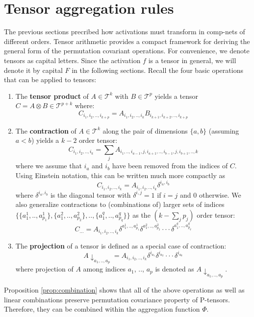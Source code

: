 \documentclass[sigchi]{acmart}
\theoremstyle{definition}
\theoremstyle{theorem}
\theoremstyle{corollary}
\theoremstyle{lemma}
\theoremstyle{remark}
\theoremstyle{prop}
\begin{document}
\section{Tensor aggregation rules}
\label{section:tensor-rules}

The previous sections precribed how activations must transform in comp-nets of different orders. Tensor arithmetic provides a compact framework for deriving the general form of the permutation covariant operations. For convenience, we denote tensors as capital letters. Since the activation $f$ is a tensor in general, we will denote it by capital $F$ in the following sections. Recall the four basic operations that can be applied to tensors:
\begin{enumerate}
\item The \textbf{tensor product} of $A \in \mathcal{T}^k$ with $B \in \mathcal{T}^p$ yields a tensor $C = A \otimes B \in \mathcal{T}^{p + k}$ where:
$$C_{i_1, i_2, .., i_{k + p}} = A_{i_1, i_2, .., i_k} B_{i_{k + 1}, i_{k + 2}, .., i_{k + p}}$$
\item The \textbf{contraction} of $A \in \mathcal{T}^k$ along the pair of dimensions $\{a, b\}$ (assuming $a < b$) yields a $k - 2$ order tensor:
$$C_{i_1, i_2, .., i_k} = \sum\limits_j A_{i_1, .., i_{a - 1}, j, i_{a + 1}, .., i_{b - 1}, j, i_{b + 1}, .., k}$$
where we assume that $i_a$ and $i_b$ have been removed from the indices of $C$. Using Einstein notation, this can be written much more compactly as
$$C_{i_1, i_2, .., i_k} = A_{i_1, i_2, .., i_k} \delta^{i_a, i_b}$$
where $\delta^{i_a, i_b}$ is the diagonal tensor with $\delta^{i, j} = 1$ if $i = j$ and 0 otherwise. We also generalize contractions to (combinations of) larger sets of indices $\{\{a_1^1, .., a_{p_1}^1\}, \{a_1^2, .., a_{p_2}^2\}, .., \{a_1^q, .., a_{p_q}^q\}\}$ as the $(k - \sum_j p_j)$ order tensor:
$$C_{...} = A_{i_1, i_2, .., i_k} \delta^{a_1^1, .., a_{p_1}^1} \delta^{a_1^2, .., a_{p_2}^2} \cdot \cdot \cdot \delta^{a_1^q, .., a_{p_q}^q}$$
\item The \textbf{projection} of a tensor is defined as a special case of contraction:
$$A\downarrow_{a_1, .., a_p} = A_{i_1, i_2, .., i_k} \delta^{i_{a_1}} \delta^{i_{a_2}} \cdot \cdot \cdot \delta^{i_{a_k}}$$
where projection of $A$ among indices $a_1$, .., $a_p$ is denoted as $A\downarrow_{a_1, .., a_p}$.
\end{enumerate}
Proposition \ref{prop:combination} shows that all of the above operations as well as linear combinations preserve permutation covariance property of P-tensors. Therefore, they can be combined within the aggregation function $\Phi$.
\end{document}
